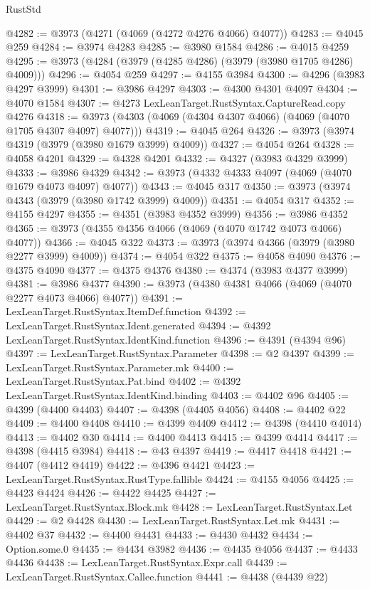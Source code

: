 \begin{lexlean}{RustStd}
\begin{coremodule}
@4282 := @3973 (@4271 (@4069 (@4272 @4276 @4066) @4077))
@4283 := @4045 @259
@4284 := @3974 @4283
@4285 := @3980 @1584
@4286 := @4015 @4259
@4295 := @3973 (@4284 (@3979 (@4285 @4286) (@3979 (@3980 @1705 @4286) @4009)))
@4296 := @4054 @259
@4297 := @4155 @3984
@4300 := @4296 (@3983 @4297 @3999)
@4301 := @3986 @4297
@4303 := @4300 @4301 @4097
@4304 := @4070 @1584
@4307 := @4273 LexLeanTarget.RustSyntax.CaptureRead.copy @4276
@4318 := @3973 (@4303 (@4069 (@4304 @4307 @4066) (@4069 (@4070 @1705 @4307 @4097) @4077)))
@4319 := @4045 @264
@4326 := @3973 (@3974 @4319 (@3979 (@3980 @1679 @3999) @4009))
@4327 := @4054 @264
@4328 := @4058 @4201
@4329 := @4328 @4201
@4332 := @4327 (@3983 @4329 @3999)
@4333 := @3986 @4329
@4342 := @3973 (@4332 @4333 @4097 (@4069 (@4070 @1679 @4073 @4097) @4077))
@4343 := @4045 @317
@4350 := @3973 (@3974 @4343 (@3979 (@3980 @1742 @3999) @4009))
@4351 := @4054 @317
@4352 := @4155 @4297
@4355 := @4351 (@3983 @4352 @3999)
@4356 := @3986 @4352
@4365 := @3973 (@4355 @4356 @4066 (@4069 (@4070 @1742 @4073 @4066) @4077))
@4366 := @4045 @322
@4373 := @3973 (@3974 @4366 (@3979 (@3980 @2277 @3999) @4009))
@4374 := @4054 @322
@4375 := @4058 @4090
@4376 := @4375 @4090
@4377 := @4375 @4376
@4380 := @4374 (@3983 @4377 @3999)
@4381 := @3986 @4377
@4390 := @3973 (@4380 @4381 @4066 (@4069 (@4070 @2277 @4073 @4066) @4077))
@4391 := LexLeanTarget.RustSyntax.ItemDef.function
@4392 := LexLeanTarget.RustSyntax.Ident.generated
@4394 := @4392 LexLeanTarget.RustSyntax.IdentKind.function
@4396 := @4391 (@4394 @96)
@4397 := LexLeanTarget.RustSyntax.Parameter
@4398 := @2 @4397
@4399 := LexLeanTarget.RustSyntax.Parameter.mk
@4400 := LexLeanTarget.RustSyntax.Pat.bind
@4402 := @4392 LexLeanTarget.RustSyntax.IdentKind.binding
@4403 := @4402 @96
@4405 := @4399 (@4400 @4403)
@4407 := @4398 (@4405 @4056)
@4408 := @4402 @22
@4409 := @4400 @4408
@4410 := @4399 @4409
@4412 := @4398 (@4410 @4014)
@4413 := @4402 @30
@4414 := @4400 @4413
@4415 := @4399 @4414
@4417 := @4398 (@4415 @3984)
@4418 := @43 @4397
@4419 := @4417 @4418
@4421 := @4407 (@4412 @4419)
@4422 := @4396 @4421
@4423 := LexLeanTarget.RustSyntax.RustType.fallible
@4424 := @4155 @4056
@4425 := @4423 @4424
@4426 := @4422 @4425
@4427 := LexLeanTarget.RustSyntax.Block.mk
@4428 := LexLeanTarget.RustSyntax.Let
@4429 := @2 @4428
@4430 := LexLeanTarget.RustSyntax.Let.mk
@4431 := @4402 @37
@4432 := @4400 @4431
@4433 := @4430 @4432
@4434 := Option.some.{0}
@4435 := @4434 @3982
@4436 := @4435 @4056
@4437 := @4433 @4436
@4438 := LexLeanTarget.RustSyntax.Expr.call
@4439 := LexLeanTarget.RustSyntax.Callee.function
@4441 := @4438 (@4439 @22)

\end{coremodule}
\end{lexlean}
